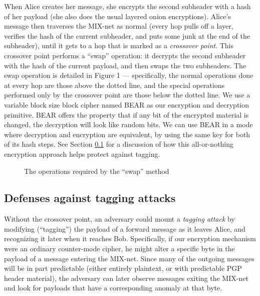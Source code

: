 \documentclass{llncs}
\begin{document}
When Alice creates her message, she encrypts the second subheader
with a hash of her payload (she also does the usual layered onion
encryptions). Alice's message then traverses the MIX-net as normal (every
hop pulls off a layer, verifies the hash of the current subheader,
and puts some junk at the end of the subheader), until it gets to a
hop that is marked as a \emph{crossover point}. This crossover point
performs a ``swap'' operation: it decrypts the second subheader with
the hash of the current payload, and then swaps the two subheaders. The
swap operation is detailed in Figure 1 --- specifically, the normal
operations done at every hop are those above the dotted line, and the
special operations performed only by the crossover point are those below
the dotted line.  We use a variable block size block cipher named BEAR
\cite{BEAR} as our encryption and decryption primitive.  BEAR offers
the property that if any bit of the encrypted material is changed, the
decryption will look like random bits. We can use BEAR in a mode where
decryption and encryption are equivalent, by using the same key for
both of its hash steps. See Section \ref{subsec:tagging} for a discussion of
how this all-or-nothing encryption approach helps protect against tagging.


\begin{figure}
\begin{center}
\caption{The operations required by the ``swap'' method} 
\end{center}
\end{figure}


\subsection{Defenses against tagging attacks}
\label{subsec:tagging}


Without the crossover point, an adversary could mount a \emph{tagging
attack} by modifying (``tagging'') the payload of a forward message as
it leaves Alice, and recognizing it later when it reaches Bob.
Specifically, if our encryption mechanism were an ordinary
counter-mode cipher, he might alter a specific byte in the payload of
a message entering the MIX-net. Since many of the outgoing messages
will be in part predictable (either entirely plaintext, or with
predictable PGP header material), the adversary can later observe
messages exiting the MIX-net and look for payloads that have a
corresponding anomaly at that byte.
\end{document}
